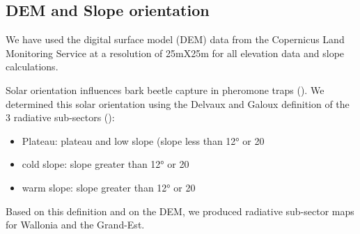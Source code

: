 \documentclass[3p,times]{elsarticle}
\begin{document}

	



\subsection{DEM and Slope orientation}


We have used the digital surface model (DEM) data from the Copernicus Land Monitoring Service \citep{DEM_copernicus}  at a resolution of 25mX25m for all elevation data and slope calculations.


Solar orientation influences bark beetle capture in pheromone traps (\citep{AFR64}). We determined this solar orientation using the Delvaux and Galoux definition of the 3 radiative sub-sectors  (\citep{Delvaux_galoux}):
\begin{itemize} 
\item Plateau: plateau and low slope (slope less than 12° or 20%
\item cold slope: slope greater than 12° or 20%
\item warm slope: slope greater than 12° or 20%
\end{itemize}
Based on this definition and on the DEM, we produced radiative sub-sector maps for Wallonia and the Grand-Est.
\end{document}
